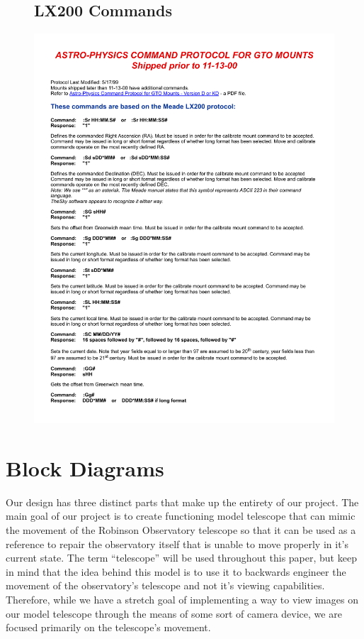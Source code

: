 \documentclass[12pt]{report}
\begin{document}
\begin{figure}
	\subsection*{LX200 Commands}
	\includegraphics[height=\textheight,width=\linewidth]{LX200commands}
\end{figure}

\clearpage


\section*{Block Diagrams}

Our design has three distinct parts that make up the entirety of our project. The main goal of our project is to create functioning model telescope that can mimic the movement of the Robinson Observatory telescope so that it can be used as a reference to repair the observatory itself that is unable to move properly in it’s current state. The term “telescope” will be used throughout this paper, but keep in mind that the idea behind this model is to use it to backwards engineer the movement of the observatory’s telescope and not it’s viewing capabilities. Therefore, while we have a stretch goal of implementing a way to view images on our model telescope through the means of some sort of camera device, we are focused primarily on the telescope’s movement.
\end{document}
